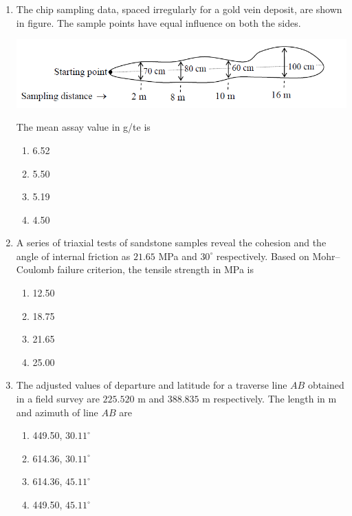 \documentclass[journal]{IEEEtran}
\begin{document}
\begin{enumerate}[leftmargin=0pt]


\item The chip sampling data, spaced irregularly for a gold vein deposit, are shown in figure.
The sample points have equal influence on both the sides.



\begin{center}
  \includegraphics[width=0.9\linewidth]{figs/q38} %
\end{center}

The mean assay value in g/te is

\begin{multicols}{2}
\begin{enumerate}[label=(\Alph*),itemsep=0pt,topsep=2pt]
  \item 6.52
  \item 5.50
  \item 5.19
  \item 4.50
\end{enumerate}
\end{multicols}
\hfill{}



\item A series of triaxial tests of sandstone samples reveal the cohesion and the angle of internal friction as $21.65$ MPa and $30^\circ$ respectively. Based on Mohr–Coulomb failure criterion, the tensile strength in MPa is
\begin{multicols}{2}
\begin{enumerate}[label=(\Alph*),itemsep=0pt,topsep=2pt]
  \item 12.50
  \item 18.75
  \item 21.65
  \item 25.00
\end{enumerate}
\end{multicols}
\hfill{}

\item The adjusted values of departure and latitude for a traverse line $AB$ obtained in a field survey are $225.520$ m and $388.835$ m respectively. The length in m and azimuth of line $AB$ are
\begin{multicols}{2}
\begin{enumerate}[label=(\Alph*),itemsep=0pt,topsep=2pt]
  \item 449.50, $30.11^\circ$
  \item 614.36, $30.11^\circ$
  \item 614.36, $45.11^\circ$
  \item 449.50, $45.11^\circ$
\end{enumerate}
\end{multicols}
\hfill{}


\end{enumerate}
\end{document}
